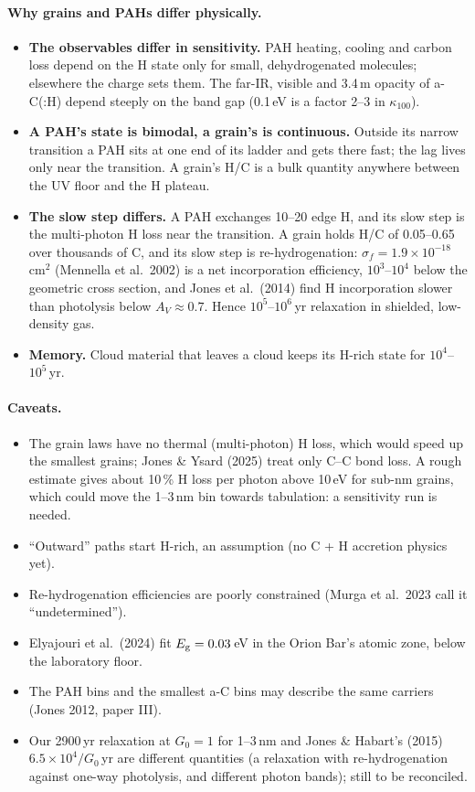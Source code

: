 \documentclass[11pt,a4paper]{article}
\newcommand{\Eg}{E_{\rm g}}
\begin{document}
\paragraph{Why grains and PAHs differ physically.}
\begin{itemize}
\item \textbf{The observables differ in sensitivity.} PAH heating, cooling and carbon loss depend on the H state only
  for small, dehydrogenated molecules; elsewhere the charge sets them. The far-IR, visible and 3.4\,\textmu m opacity of
  a-C(:H) depend steeply on the band gap (0.1\,eV is a factor 2--3 in $\kappa_{100}$).
\item \textbf{A PAH's state is bimodal, a grain's is continuous.} Outside its narrow transition a PAH sits at one end of
  its ladder and gets there fast; the lag lives only near the transition. A grain's H/C is a bulk quantity anywhere
  between the UV floor and the H plateau.
\item \textbf{The slow step differs.} A PAH exchanges 10--20 edge H, and its slow step is the multi-photon H loss near
  the transition. A grain holds H/C of 0.05--0.65 over thousands of C, and its slow step is re-hydrogenation:
  $\sigma_f = 1.9\times10^{-18}$\,cm$^2$ (Mennella et al.\ 2002) is a net incorporation efficiency, $10^3$--$10^4$ below the
  geometric cross section, and Jones et al.\ (2014) find H incorporation slower than photolysis below $A_V\approx0.7$.
  Hence $10^5$--$10^6$\,yr relaxation in shielded, low-density gas.
\item \textbf{Memory.} Cloud material that leaves a cloud keeps its H-rich state for $10^4$--$10^5$\,yr.
\end{itemize}

\paragraph{Caveats.}
\begin{itemize}
\item The grain laws have no thermal (multi-photon) H loss, which would speed up the smallest grains; Jones \& Ysard
  (2025) treat only C--C bond loss. A rough estimate gives about 10\,\% H loss per photon above 10\,eV for sub-nm
  grains, which could move the 1--3\,nm bin towards tabulation: a sensitivity run is needed.
\item ``Outward'' paths start H-rich, an assumption (no C + H accretion physics yet).
\item Re-hydrogenation efficiencies are poorly constrained (Murga et al.\ 2023 call it ``undetermined'').
\item Elyajouri et al.\ (2024) fit $\Eg = 0.03$\,eV in the Orion Bar's atomic zone, below the laboratory floor.
\item The PAH bins and the smallest a-C bins may describe the same carriers (Jones 2012, paper III).
\item Our 2900\,yr relaxation at $G_0 = 1$ for 1--3\,nm and Jones \& Habart's (2015) $6.5\times10^4/G_0$\,yr are
  different quantities (a relaxation with re-hydrogenation against one-way photolysis, and different photon bands);
  still to be reconciled.
\end{itemize}
\end{document}
